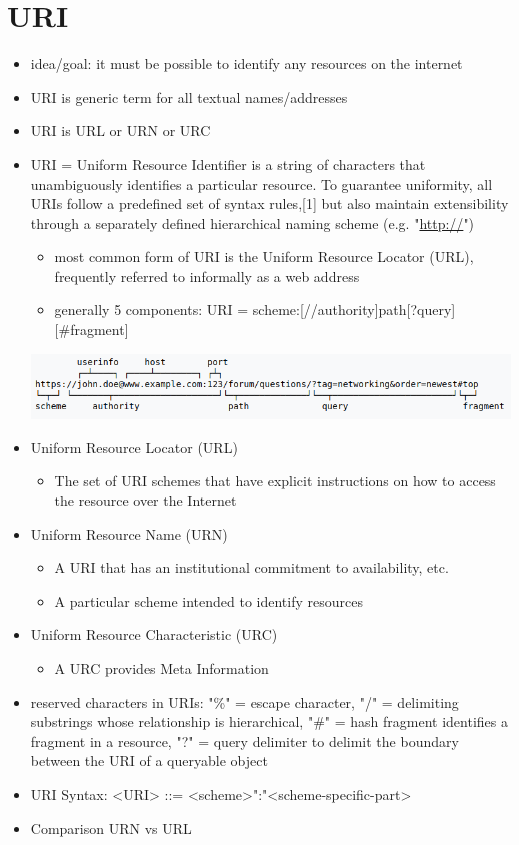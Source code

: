 \documentclass[11pt]{article}
\begin{document}
\section{URI}
\label{sec:orga38d6a7}
\begin{itemize}
\item idea/goal: it must be possible to identify any resources on the internet
\item URI is generic term for all textual names/addresses
\item URI is URL or URN or URC
\item URI = Uniform Resource Identifier is a string of characters that unambiguously identifies a particular resource. To guarantee uniformity, all URIs follow a predefined set of syntax rules,[1] but also maintain extensibility through a separately defined hierarchical naming scheme (e.g. "\url{http://}")
\begin{itemize}
\item most common form of URI is the Uniform Resource Locator (URL), frequently referred to informally as a web address
\item generally 5 components: URI = scheme:[//authority]path[?query][\#fragment]
\end{itemize}
\begin{center}
\includegraphics[width=.9\linewidth]{./uri-example.png}
\label{org8c76218}
\end{center}
\item Uniform Resource Locator (URL)
\begin{itemize}
\item The set of URI schemes that have explicit instructions on how to access the resource over the Internet
\end{itemize}
\item Uniform Resource Name (URN)
\begin{itemize}
\item A URI that has an institutional commitment to availability, etc.
\item A particular scheme intended to identify resources
\end{itemize}
\item Uniform Resource Characteristic (URC)
\begin{itemize}
\item A URC provides Meta Information
\end{itemize}
\item reserved characters in URIs: "\%" = escape character, "/" = delimiting substrings whose relationship is hierarchical, "\#" = hash fragment identifies a fragment in a resource, "?" = query delimiter to delimit the boundary between the URI of a queryable object
\item URI Syntax: <URI> ::= <scheme>":"<scheme-specific-part>
\item Comparison URN vs URL
\end{itemize}
\end{document}
